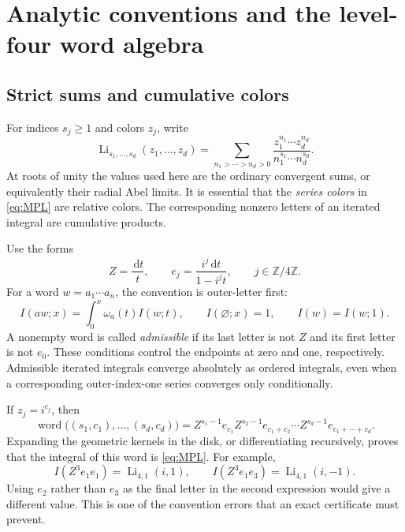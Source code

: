 \documentclass[11pt,letterpaper]{article}
\numberwithin{equation}{section}
\theoremstyle{definition}
\DeclareMathOperator{\Li}{Li}
\newcommand{\Z}{\mathbb Z}
\newcommand{\dd}{\,\mathrm d}
\newcommand{\word}{\operatorname{word}}
\begin{document}
\section{Analytic conventions and the level-four word algebra}
\label{sec:words}

\subsection{Strict sums and cumulative colors}
For indices $s_j\ge1$ and colors $z_j$, write
\begin{equation}
 \Li_{s_1,\ldots,s_d}(z_1,\ldots,z_d)
 =\sum_{n_1>\cdots>n_d>0}
   \frac{z_1^{n_1}\cdots z_d^{n_d}}
        {n_1^{s_1}\cdots n_d^{s_d}}.
 \label{eq:MPL}
\end{equation}
At roots of unity the values used here are the ordinary convergent sums,
or equivalently their radial Abel limits. It is essential that the
\emph{series colors} in \eqref{eq:MPL} are relative colors. The corresponding
nonzero letters of an iterated integral are cumulative products.

Use the forms
\begin{equation}
 Z=\frac{\dd t}{t},\qquad e_j=\frac{i^j\dd t}{1-i^jt},\qquad j\in\Z/4\Z.
 \label{eq:forms}
\end{equation}
For a word $w=a_1\cdots a_n$, the convention is outer-letter first:
\begin{equation}
 I(aw;x)=\int_0^x\omega_a(t)I(w;t),\qquad I(\varnothing;x)=1,
 \qquad I(w)=I(w;1).
 \label{eq:iterated}
\end{equation}
A nonempty word is called \emph{admissible} if its last letter is not $Z$
and its first letter is not $e_0$. These conditions control the endpoints
at zero and one, respectively. Admissible iterated integrals converge
absolutely as ordered integrals, even when a corresponding outer-index-one
series converges only conditionally.

If $z_j=i^{c_j}$, then
\begin{equation}
 \word\bigl((s_1,c_1),\ldots,(s_d,c_d)\bigr)
 =Z^{s_1-1}e_{c_1}Z^{s_2-1}e_{c_1+c_2}\cdots
   Z^{s_d-1}e_{c_1+\cdots+c_d}.
 \label{eq:wordmap}
\end{equation}
Expanding the geometric kernels in the disk, or differentiating
recursively, proves that the integral of this word is \eqref{eq:MPL}.
For example,
\begin{equation}
 I(Z^3e_1e_1)=\Li_{4,1}(i,1),\qquad
 I(Z^3e_1e_3)=\Li_{4,1}(i,-1).
 \label{eq:examplewords}
\end{equation}
Using $e_2$ rather than $e_3$ as the final letter in the second expression
would give a different value. This is one of the convention errors that
an exact certificate must prevent.
\end{document}

